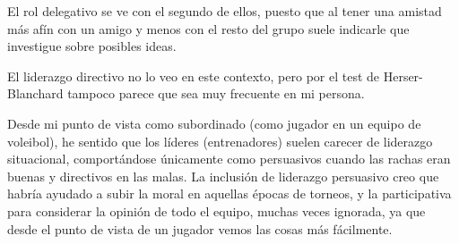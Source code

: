 El rol delegativo se ve con el segundo de ellos, puesto que al tener una amistad más afín con un amigo y menos con el resto del grupo suele indicarle que investigue sobre posibles ideas.

El liderazgo directivo no lo veo en este contexto, pero por el test de Herser-Blanchard tampoco parece que sea muy frecuente en mi persona.

\vspace{\baselineskip}

Desde mi punto de vista como subordinado (como jugador en un equipo de voleibol), he sentido que los líderes (entrenadores) suelen carecer de liderazgo situacional, comportándose únicamente como persuasivos cuando las rachas eran buenas y directivos en las malas. La inclusión de liderazgo persuasivo creo que habría ayudado a subir la moral en aquellas épocas de torneos, y la participativa para considerar la opinión de todo el equipo, muchas veces ignorada, ya que desde el punto de vista de un jugador vemos las cosas más fácilmente.


